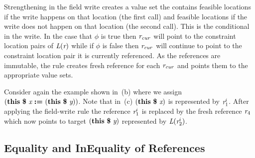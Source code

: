Strengthening in the field write creates a value set the
contains feasible locations if the write happens on that location (the
first call) and feasible locations if the write does not happen on
that location (the second call). This is the conditional in the write. In the case that $\phi$ is true
then $\emph{r}_\mathit{cur}$ will point to the constraint location pairs of
$\emph{L}(\emph{r})$ while if $\phi$ is false then $\emph{r}_\mathit{cur}$ will continue
to point to the constraint location pair it is currently referenced.
As the references are immutable, the rule creates fresh reference for
each $\emph{r}_\mathit{cur}$ and points them to the appropriate value sets.

Consider again the example shown in~(b) where we assign
$\lp\cfgt{this}\  \cfgt{\$}\ \cfgnt{x}\ \cfgt{:=}\ \lp\cfgt{this}\  \cfgt{\$}\ \cfgnt{y}\rp\rp$. Note that
in~(c) $\lp\cfgt{this}\  \cfgt{\$}\ \cfgnt{x}\rp$ is represented by
$\emph{r}_1^i$. After applying the field-write rule the reference $\emph{r}_1^i$ is
replaced by the fresh reference $\emph{r}_4$ which now points to target
 $\lp\cfgt{this}\  \cfgt{\$}\ \cfgnt{y}\rp$ represented by $\emph{L}(\emph{r}_2^i)$.


\begin{comment}
\begin{figure}[t]
\begin{center}
\begin{tabular}[c]{l}
$\Psi_x = \{ (true\ \cfgnt{l}_0\ \cfgnt{r}_1^i) \}$\\
$ST (\cfgnt{L}, \cfgnt{r}_3^s, \phi, \phi_g)$ \\
$\theta = \{ (\phi_{2a}\; \cfgnt{l}_\mathit{null} ) (\phi_{2b}\; \cfgnt{l}_2) (\phi_{2c}\; \cfgnt{l}_1) \}$\\
$ST(\cfgnt{L}, \cfgnt{r}_0, \phi, \phi_g)$\\
$\theta = \{ \}$\\
\end{tabular}
\end{center}
\caption{FIXME: When will I get a caption}
\label{fig:faHeapSets}
\end{figure}
\end{comment}



\subsection{Equality and InEquality of References}


